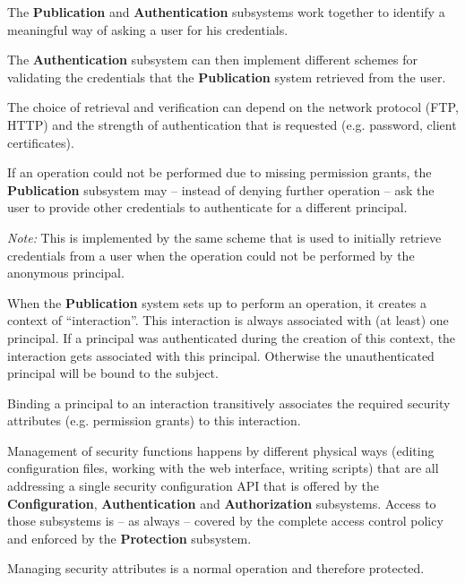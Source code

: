 \documentclass[12pt,english]{scrbook}
\begin{document}
The \textbf{Publication} and \textbf{Authentication} subsystems work together
to identify a meaningful way of asking a user for his credentials. 

The \textbf{Authentication} subsystem can then implement different schemes for
validating the credentials that the \textbf{Publication} system retrieved from
the user.

The choice of retrieval and verification can depend on the network protocol
(FTP, HTTP) and the strength of authentication that is requested (e.g. password,
client certificates).


If an operation could not be performed due to missing permission grants, the
\textbf{Publication} subsystem may -- instead of denying further operation --
ask the user to provide other credentials to authenticate for a different
principal.

\emph{Note:} This is implemented by the same scheme that is used to initially
retrieve credentials from a user when the operation could not be performed by
the anonymous principal.


When the \textbf{Publication} system sets up to perform an operation, it
creates a context of ``interaction''. This interaction is always associated
with (at least) one principal. If a principal was authenticated during the
creation of this context, the interaction gets associated with this principal.
Otherwise the unauthenticated principal will be bound to the subject.

Binding a principal to an interaction transitively associates the required security
attributes (e.g. permission grants) to this interaction.


Management of security functions happens by different physical ways (editing
configuration files, working with the web interface, writing scripts) that are
all addressing a single security configuration API that is offered by the
\textbf{Configuration}, \textbf{Authentication} and \textbf{Authorization}
subsystems. Access to those subsystems is -- as always -- covered by the
complete access control policy and enforced by the \textbf{Protection}
subsystem.


Managing security attributes is a normal operation and therefore protected.
\end{document}
